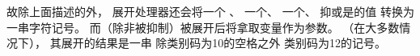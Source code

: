 \documentclass{book}
\begin{document}
故除上面描述的外，
展开处理器还会将一个
、
一个、
一个、
抑或是的值
转换为一串字符记号。
而（除非被抑制）被展开后将拿取变量作为参数。
（在大多数情况下），
其展开的结果是一串
除类别码为10的空格之外
类别码为12的记号。
\end{document}
